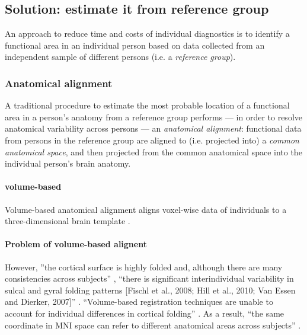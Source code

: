 \subsection{Solution: estimate it from reference group}

An approach to reduce time and costs of individual diagnostics is to identify a
functional area in an individual person based on data collected from an
independent sample of different persons (i.e. a \textit{reference group}).


\subsubsection{Anatomical alignment}

%
A traditional procedure \citep{frost2012measuring, weiner2018defining,
zhen2017quantifying, zhen2015quantifying, rosenke2021probabilistic,
wang2015probabilistic} to estimate the most probable location of a functional
area in a person's anatomy from a reference group performs --- in order to
resolve anatomical variability across persons --- an \textit{anatomical
alignment}:
%
functional data from persons in the reference group are aligned to (i.e.
projected into) a \textit{common anatomical space}, and then projected from the
common anatomical space into the individual person's brain anatomy.


\paragraph{volume-based}
Volume-based anatomical alignment \citep[s.][for a review]{klein2009evaluation}
aligns voxel-wise data of individuals to a three-dimensional brain template
\citep[e.g., MNI152 template;][]{fonov2011unbiased}.


\paragraph{Problem of volume-based alignent}

However, ''the cortical surface is highly folded and, although there are many
consistencies across subjects'' \citep{frost2012measuring}, ``there is
significant interindividual variability in sulcal and gyral folding patterns
[Fischl et al., 2008; Hill et al., 2010; Van Essen and Dierker, 2007]''
\citep{zhen2017quantifying}.
%
``Volume-based registration techniques are unable to account for individual
differences in cortical folding'' \citep{frost2012measuring}.
%
As a result, ``the same coordinate in MNI space can refer to different
anatomical areas across subjects'' \citep{frost2012measuring}.



